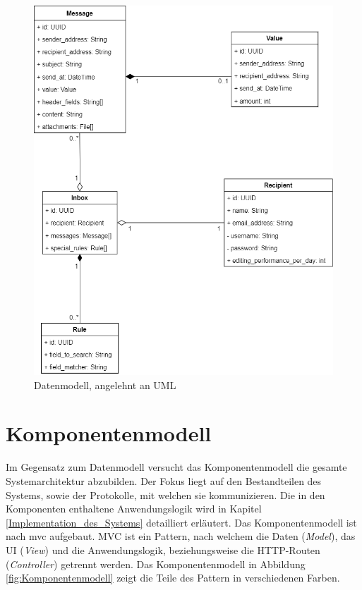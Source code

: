 \begin{figure}[!ht]
	\centering
		\includegraphics[width=1\textwidth]{Figures/Datenmodell.png}
	\caption{Datenmodell, angelehnt an UML}
	\label{fig:Datenmodell}
\end{figure}


\section{Komponentenmodell}
\label{Komponentendiagramm}
Im Gegensatz zum Datenmodell versucht das Komponentenmodell die gesamte Systemarchitektur abzubilden. Der Fokus liegt auf den Bestandteilen des Systems, sowie der Protokolle, mit welchen sie kommunizieren. Die in den Komponenten enthaltene Anwendungslogik wird in Kapitel \ref{Implementation_des_Systems} detailliert erläutert. Das Komponentenmodell ist nach \acrfull{mvc} aufgebaut. MVC ist ein Pattern, nach welchem die Daten (\textit{Model}), das UI (\textit{View}) und die Anwendungslogik, beziehungsweise die HTTP-Routen (\textit{Controller}) getrennt werden. Das Komponentenmodell in Abbildung \ref{fig:Komponentenmodell} zeigt die Teile des Pattern in verschiedenen Farben.

